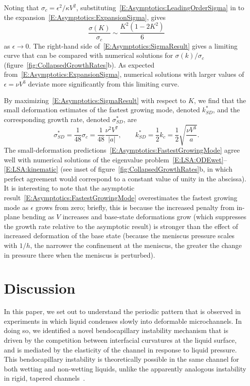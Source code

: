 \documentclass{jfm}
\newcommand{\aspect}{a} %
\begin{document}
Noting that $\sigma_c = \epsilon^2/\kappa V^2$, substituting~\eqref{E:Asymptotics:LeadingOrderSigma} in to the expansion~\eqref{E:Asymptotics:ExpansionSigma}, gives
\begin{equation}\label{E:Asymptotics:SigmaResult}
\frac{\sigma(K)}{\sigma_c} \sim  \frac{K^2\left(1-2K^2 \right)}{6}
\end{equation}
as $\epsilon \to 0$. The right-hand side of~\eqref{E:Asymptotics:SigmaResult} gives a limiting curve that can be compared with numerical solutions for $\sigma(k)/\sigma_c$ (figure~\ref{fig:CollapsedGrowthRates}b). As expected from~\eqref{E:Asymptotics:ExpansionSigma}, numerical solutions with larger values of $\epsilon = \nu V^3$ deviate more significantly from this limiting curve.

By maximizing~\eqref{E:Asymptotics:SigmaResult} with respect to $K$, we find that the small deformation estimates of the fastest growing mode, denoted $k^*_{SD}$, and the corresponding growth rate, denoted $\sigma^*_{SD}$, are
\begin{equation}\label{E:Asymptotics:FastestGrowingMode}
\sigma^*_{SD}= \frac{1}{48}\sigma_c = \frac{1}{48}\frac{\nu^2 V^7}{|\aspect|}, \qquad k^*_{SD}= \frac{1}{2}k_c = \frac{1}{2}\sqrt{\frac{\nu V^3}{\aspect}}.
\end{equation}
The small-deformation predictions~\eqref{E:Asymptotics:FastestGrowingMode} agree well with numerical solutions of the eigenvalue problem~\eqref{E:LSA:ODEwet}--\eqref{E:LSA:kinematic} (see inset of figure~\ref{fig:CollapsedGrowthRates}b, in which perfect agreement would correspond to a constant value of unity in the abscissa). It is interesting to note that the asymptotic result~\eqref{E:Asymptotics:FastestGrowingMode} overestimates the fastest growing mode as $\epsilon$ grows from zero; briefly, this is because the increased penalty from in-plane bending as $V$ increases and base-state deformations grow (which suppresses the growth rate relative to the asymptotic result) is stronger than the effect of increased deformation of the base state (because the meniscus pressure scales with $1/h$, the narrower the confinement at the meniscus, the greater the change in pressure there when the meniscus is perturbed).

\section{Discussion}\label{S:Conclusion}
In this paper, we set out to understand the periodic pattern that is observed in experiments in which liquid condenses slowly into deformable microchannels. In doing so, we identified a novel bendocapillary instability mechanism that is driven by the competition between interfacial curvatures at the liquid surface, and is mediated by the elasticity of the channel in response to liquid pressure. This bendocapillary instability is theoretically possible in the same channel for both wetting and non-wetting liquids, unlike the apparently analogous instability in rigid, tapered channels~\citep{AlHousseiny2012NaturePhysics}.
\end{document}
